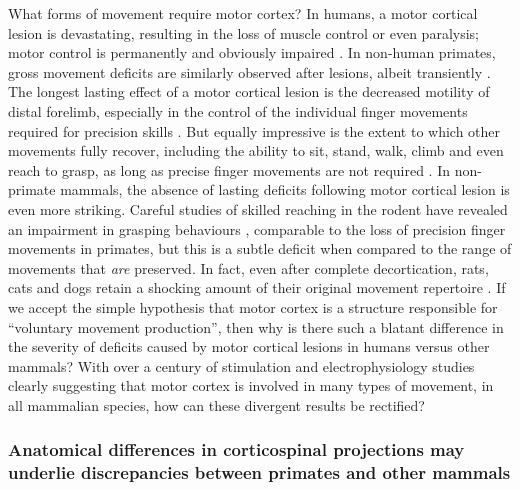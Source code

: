 What forms of movement require motor cortex? In humans, a motor cortical lesion is devastating, resulting in the loss of muscle control or even paralysis; motor control is permanently and obviously impaired \cite{Laplane1977}. In non-human primates, gross movement deficits are similarly observed after lesions, albeit transiently \cite{Leyton1917}. The longest lasting effect of a motor cortical lesion is the decreased motility of distal forelimb, especially in the control of the individual finger movements required for precision skills \cite{Leyton1917,Darling2011}. But equally impressive is the extent to which other movements fully recover, including the ability to sit, stand, walk, climb and even reach to grasp, as long as precise finger movements are not required \cite{Leyton1917,Darling2011,Zaaimi2012}. In non-primate mammals, the absence of lasting deficits following motor cortical lesion is even more striking. Careful studies of skilled reaching in the rodent have revealed an impairment in grasping behaviours \cite{Alaverdashvili2008a}, comparable to the loss of precision finger movements in primates, but this is a subtle deficit when compared to the range of movements that \emph{are} preserved. In fact, even after complete decortication, rats, cats and dogs retain a shocking amount of their original movement repertoire \cite{Bjursten1976,Terry1989}. If we accept the simple hypothesis that motor cortex is a structure responsible for ``voluntary movement production'', then why is there such a blatant difference in the severity of deficits caused by motor cortical lesions in humans versus other mammals? With over a century of stimulation and electrophysiology studies clearly suggesting that motor cortex is involved in many types of movement, in all mammalian species, how can these divergent results be rectified?

\subsubsection*{Anatomical differences in corticospinal projections may underlie discrepancies between primates and other mammals}

